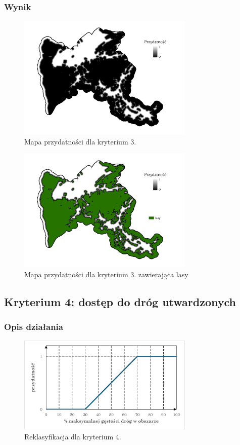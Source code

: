 \documentclass{article}
\begin{document}
\subsubsection{Wynik}
\begin{figure}[H]
    \centering
    \includegraphics[width=0.75\textwidth]{img/kryterium3-layout.jpg}
    \caption*{Mapa przydatności dla kryterium 3.}
\end{figure}

\begin{figure}[H]
    \centering
    \includegraphics[width=0.75\textwidth]{img/kryterium3-lasy.jpg}
    \caption*{Mapa przydatności dla kryterium 3. zawierająca lasy}
\end{figure}

\newpage
\subsection{Kryterium 4: dostęp do dróg utwardzonych}
\subsubsection{Opis działania}
\begin{figure}[H]
    \centering
    \includegraphics[width=0.75\textwidth]{img/kryterium4-wykres-glowny.png}
    \caption*{Reklasyfikacja dla kryterium 4.}
\end{figure}
\end{document}

